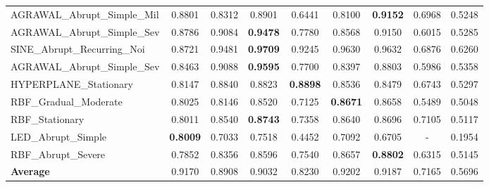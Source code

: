\begin{table}[htbp]
\begin{tabular}{lcccccccc}
AGRAWAL_Abrupt_Simple_Mil & 0.8801 & 0.8312 & 0.8901 & 0.6441 & 0.8100 & \textbf{0.9152} & 0.6968 & 0.5248 \\
AGRAWAL_Abrupt_Simple_Sev & 0.8786 & 0.9084 & \textbf{0.9478} & 0.7780 & 0.8568 & 0.9150 & 0.6015 & 0.5285 \\
SINE_Abrupt_Recurring_Noi & 0.8721 & 0.9481 & \textbf{0.9709} & 0.9245 & 0.9630 & 0.9632 & 0.6876 & 0.6260 \\
AGRAWAL_Abrupt_Simple_Sev & 0.8463 & 0.9088 & \textbf{0.9595} & 0.7700 & 0.8397 & 0.8803 & 0.5986 & 0.5358 \\
HYPERPLANE_Stationary & 0.8147 & 0.8840 & 0.8823 & \textbf{0.8898} & 0.8536 & 0.8479 & 0.6743 & 0.5297 \\
RBF_Gradual_Moderate & 0.8025 & 0.8146 & 0.8520 & 0.7125 & \textbf{0.8671} & 0.8658 & 0.5489 & 0.5048 \\
RBF_Stationary & 0.8011 & 0.8540 & \textbf{0.8743} & 0.7358 & 0.8640 & 0.8696 & 0.7105 & 0.5117 \\
LED_Abrupt_Simple & \textbf{0.8009} & 0.7033 & 0.7518 & 0.4452 & 0.7092 & 0.6705 & - & 0.1954 \\
RBF_Abrupt_Severe & 0.7852 & 0.8356 & 0.8596 & 0.7540 & 0.8657 & \textbf{0.8802} & 0.6315 & 0.5145 \\
\midrule
\textbf{Average} & 0.9170 & 0.8908 & 0.9032 & 0.8230 & 0.9202 & 0.9187 & 0.7165 & 0.5696 \\
\bottomrule
\end{tabular}
\end{table}